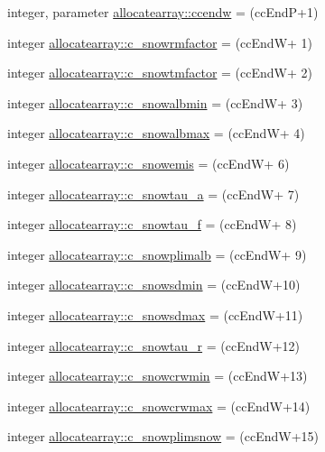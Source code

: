 \begin{DoxyCompactItemize}
\item 
integer, parameter \hyperlink{namespaceallocatearray_a2390a4cc2be9de4c4617bd8d62d3fec5}{allocatearray\+::ccendw} = (cc\+EndP+1)
\item 
integer \hyperlink{namespaceallocatearray_acfdafb59cd575be2fd9b042c4960250c}{allocatearray\+::c\+\_\+snowrmfactor} = (cc\+EndW+ 1)
\item 
integer \hyperlink{namespaceallocatearray_ab9775d921ab8069a25db5abdd6016153}{allocatearray\+::c\+\_\+snowtmfactor} = (cc\+EndW+ 2)
\item 
integer \hyperlink{namespaceallocatearray_adaf3092de4c0d3a58b29d1d1bb2120d8}{allocatearray\+::c\+\_\+snowalbmin} = (cc\+EndW+ 3)
\item 
integer \hyperlink{namespaceallocatearray_a2293a566f60b8c13fa4dfa83609d4f8a}{allocatearray\+::c\+\_\+snowalbmax} = (cc\+EndW+ 4)
\item 
integer \hyperlink{namespaceallocatearray_ae99fe2af29160de023e0a5f25ad4452e}{allocatearray\+::c\+\_\+snowemis} = (cc\+EndW+ 6)
\item 
integer \hyperlink{namespaceallocatearray_a8798dff47bfb8c70e2366c6009fa3511}{allocatearray\+::c\+\_\+snowtau\+\_\+a} = (cc\+EndW+ 7)
\item 
integer \hyperlink{namespaceallocatearray_a69df173e9777ee44bef7a9ffe6254b33}{allocatearray\+::c\+\_\+snowtau\+\_\+f} = (cc\+EndW+ 8)
\item 
integer \hyperlink{namespaceallocatearray_a29849c819c360ae6df83cd8bd1a15b69}{allocatearray\+::c\+\_\+snowplimalb} = (cc\+EndW+ 9)
\item 
integer \hyperlink{namespaceallocatearray_a9e036260613b3816f415963f40cb52ed}{allocatearray\+::c\+\_\+snowsdmin} = (cc\+EndW+10)
\item 
integer \hyperlink{namespaceallocatearray_a162466ba880bbb5e5ad214b1a9db1c47}{allocatearray\+::c\+\_\+snowsdmax} = (cc\+EndW+11)
\item 
integer \hyperlink{namespaceallocatearray_a3ca258b93aa4dd7d60ffad4b6f975f84}{allocatearray\+::c\+\_\+snowtau\+\_\+r} = (cc\+EndW+12)
\item 
integer \hyperlink{namespaceallocatearray_a8594b1be384b1a335f6908d383946f28}{allocatearray\+::c\+\_\+snowcrwmin} = (cc\+EndW+13)
\item 
integer \hyperlink{namespaceallocatearray_a401fe8a789d9f33b9a9d3d1423c789cd}{allocatearray\+::c\+\_\+snowcrwmax} = (cc\+EndW+14)
\item 
integer \hyperlink{namespaceallocatearray_a1a9bfdeb2c6ae724ce49d9bb942e84bb}{allocatearray\+::c\+\_\+snowplimsnow} = (cc\+EndW+15)

\end{DoxyCompactItemize}
